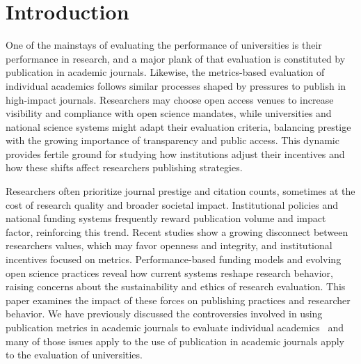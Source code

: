 \documentclass[amsfonts, amssymb, prl, superscriptaddress, notitlepage, twocolumn, nofootinbib]{revtex4-2}
\begin{document}
\maketitle 

\section{Introduction}
One of the mainstays of evaluating the performance of universities is their performance in research, and a major plank of that evaluation is constituted by publication in academic journals. Likewise, the metrics-based evaluation of individual academics follows similar processes shaped by pressures to publish in high-impact journals. Researchers may choose open access venues to increase visibility and compliance with open science mandates, while universities and national science systems might adapt their evaluation criteria, balancing prestige with the growing importance of transparency and public access. This dynamic provides fertile ground for studying how institutions adjust their incentives and how these shifts affect researchers publishing strategies.

Researchers often prioritize journal prestige and citation counts, sometimes at the cost of research quality and broader societal impact. Institutional policies and national funding systems frequently reward publication volume and impact factor, reinforcing this trend. Recent studies show a growing disconnect between researchers values, which may favor openness and integrity, and institutional incentives focused on metrics. Performance-based funding models and evolving open science practices reveal how current systems reshape research behavior, raising concerns about the sustainability and ethics of research evaluation. This paper examines the impact of these forces on publishing practices and researcher behavior. We have previously discussed the controversies involved in using publication metrics in academic journals to evaluate individual academics~\cite{watson2023assessing} and many of those issues apply to the use of publication in academic journals apply to the evaluation of universities.
\end{document}
